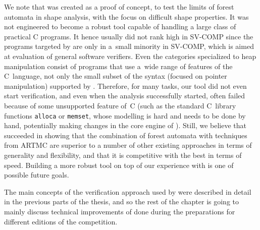 {We note that \forester was created as a proof of concept, to test the limits of forest automata in shape analysis,
with the focus on difficult shape properties. 
It was not engineered to become a robust tool capable of handling a large class of practical C programs. 
%
It hence usually did not rank high in SV-COMP since the programs
targeted by \forester are only in a~small minority in SV-COMP, which is aimed at
evaluation of general software verifiers.
Even the categories specialized to heap manipulation consist of programs that
use a~wide range of features of the C~language, not only the small subset of the syntax
(focused on pointer manipulation) supported by \forester{}.
Therefore, for many tasks, our tool did not even start verification, and even
when the analysis successfully started, \forester{} often failed because
of some unsupported feature of~C (such as the standard C~library functions
\texttt{alloca} or \texttt{memset}, whose modelling is hard and needs to be done by
hand, potentially making changes in the core engine of \forester).
%
Still, we believe that \forester succeeded in showing that the combination of forest automata with techniques
from ARTMC are superior to a number of other existing approaches in terms of generality and flexibility, and that it is competitive with the best in terms of speed.
%
Building a more robust tool on top of our experience with \forester is one of possible future goals.

The main concepts of the verification approach used by \forester were described in detail in the previous parts of the thesis,
and so the rest of the chapter is going to mainly discuss technical improvements of \forester done during the preparations for different editions of the competition.


}
